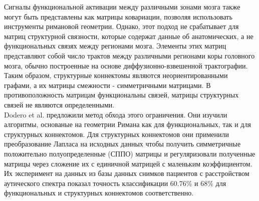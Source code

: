 \indent Сигналы функциональной активации между различными зонами мозга также могут быть представлены как матрицы ковариации, позволяя использовать инструменты римановой геометрии. Однако, этот подход не срабатывает для матриц структурной связности, которые содержат данные об анатомических, а не функциональных связях между регионами мозга. Элементы этих матриц представляют собой число трактов между различными регионами коры головного мозга, обычно построенные на основе диффузионно-взвешенной трактографии. Таким образом, структурные коннектомы являются неориентированными графами, а их матрицы смежности - симметричными матрицами. В противоположность матрицам функциональны связей, матрицы структурных связей не являются определенными. \\

\indent Dodero et al.\cite{dodero2015kernel} предложили метод обхода этого ограничения. Они изучили алгоритмы, основаные на геометрии Римана как для функциональных, так и для структурных коннектомов. Для структурных коннектомов они применили преобразование Лапласа на исходных данных чтобы получить симметричные положительно полуопределенные (СППО) матрицы и регуляризовали полученные матрицы через сложение их с единичной матрицей с маленьким коэффициентом. Их эксперимент на данных из базы данных снимков пациентов с расстройством аутического спектра показал точность классификации 60.76\% и 68\% для функциональных и структурных коннектомов соответственно.